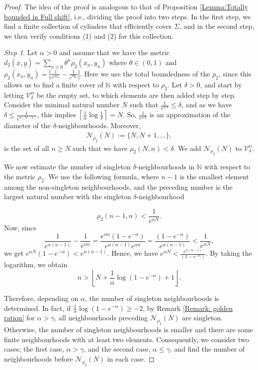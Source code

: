 \documentclass[10pt,a4paper]{amsart}
\def\N{\ensuremath{\mathbb N}}
\def\st{such that }
\def\ulx{\underline{x}}
\begin{document}
\begin{proof}
 The idea of the proof is analogous to that of Proposition \ref{Lemma:Totally bounded in Full shift}, i.e., dividing the proof into two steps. In the first step, we find a finite collection of cylinders that efficiently cover $\Sigma$, and in the second step, we then verify conditions (1) and (2) for this collection. 
 
\textit{Step 1}. Let $\alpha>0$ and assume that we have the metric $d_2(\ulx,\underline{y})=\sum_{n\ge 0} \theta^n  \rho_2(x_n, y_n)$ where $\theta\in(0,1)$ and $\rho_2(x_n, y_n) = \left| \frac{1}{e^{\alpha x_n}} - \frac{1}{e^{\alpha y_n}} \right|$. Here we use the total boundedness of the $\rho_2$, since this allows us to find a finite cover of $\N$ with respect to $\rho_2$. Let $\delta> 0$, and start by letting $\mathcal{V}_\delta^\alpha$ be the empty set, to which elements are then added step by step. Consider the minimal natural number $N$ \st $\frac{1}{e^{\alpha N}}\le \delta$, and as we have $\delta\le\frac{1}{e^{\alpha (N-1)}}$, this implies $\left\lceil\frac{1}{\alpha}\log\frac{1}{\delta}\right\rceil= N$. So, $\frac{1}{e^{\alpha N}}$ is an approximation of the diameter of the $\delta$-neighbourhoods. Moreover,
\begin{align}\label{Countable set of N d_2+}
    \mathcal{N}_{\rho_2}(N):=\{N,N+1,\ldots\},
\end{align}
is the set of all $n\ge N$ \st we have ${\rho_2}(N,n)<\delta$. We add $\mathcal{N}_{\rho_2}(N)$ to $\mathcal{V}_\delta^{\alpha}$.


We now estimate the number of singleton $\delta$-neighbourhoods in $\N$ with respect to the metric $\rho_2$. We use the following formula, where $n-1$ is the smallest element among the non-singleton neighbourhoods, and the preceding number is the largest natural number with the singleton $\delta$-neighbourhood

$$\rho_2(n-1,n)<\frac{1}{e^{\alpha N}}.$$
Now, since 
$$ \frac{1}{e^{\alpha(n-1)}}-\frac{1}{e^{\alpha n}}=\frac{e^{\alpha n}(1-e^{-\alpha})}{e^{\alpha (n-1)}e^{\alpha n}}=\frac{(1-e^{-\alpha})}{e^{\alpha (n-1)}}<\frac{1}{e^{\alpha N}},$$
we get $e^{\alpha N}(1-e^{-\alpha})<e^{\alpha (n-1)}$. Hence, we have $e^{\alpha N}<\frac{e^{\alpha (n-1)}}{(1-e^{-\alpha})}$. By taking the logarithm, we obtain
$$n>\left\lfloor N+\frac{1}{\alpha}\log(1-e^{-\alpha})+1  \right\rfloor.$$

 Therefore, depending on $\alpha$, the number of singleton neighbourhoods is determined. In fact, if $\frac{1}{\alpha}\log(1-e^{-\alpha})\ge-2$, by Remark \ref{Remark: golden ration} for $\alpha> \gamma$, all neighbourhoods preceding $\mathcal{N}_{\rho_2}(N)$ are singleton. Otherwise, the number of singleton neighbourhoods is smaller and there are some finite neighbourhoods with at least two elements. Consequently, we consider two cases; the first case, $\alpha>\gamma$, and the second case, $\alpha\le \gamma$, and find the number of neighbourhoods before $\mathcal{N}_{\rho_2}(N)$ in each case. 
 

\end{proof}
\end{document}
